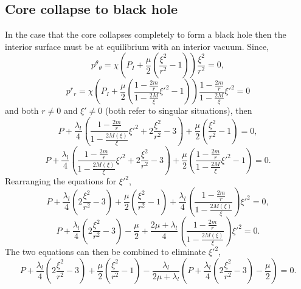 \subsection{Core collapse to black hole}
In the case that the core collapses completely to form a black hole then the interior surface must be at equilibrium with an interior vacuum. Since,
\begin{equation}
p^\theta{}_\theta = \chi\left(P_I + \frac{\mu}{2} \left(\frac{\xi^2}{r^2} - 1\right) \right) \frac{\xi^2}{r^2} = 0,
\label{eq:tangentialPressureVanishes}
\end{equation}
\begin{equation}
p^r{}_r = \chi\left(P_I + \frac{\mu}{2}\left(\frac{1-\frac{2m}{r}}{1-\frac{2M}{\xi}}\xi'^2 - 1\right)\right)\frac{1-\frac{2m}{r}}{1-\frac{2M}{\xi}}\xi'^2 = 0
\label{eq:radialPressureVanishes}
\end{equation}
and both $r\ne 0$ and $\xi' \ne 0$ (both refer to singular situations), then
\begin{equation}
P + \frac{\lambda_l}{4}\left( \frac{1 - \frac{2m}{r}}{1 - \frac{2M(\xi)}{\xi}}\xi'^2 + 2\frac{\xi^2}{r^2} - 3 \right)+ \frac{\mu}{2} \left(\frac{\xi^2}{r^2} - 1\right) = 0,
\label{eq:tangentialBHCondition}
\end{equation}
\begin{equation}
P + \frac{\lambda_l}{4}\left( \frac{1 - \frac{2m}{r}}{1 - \frac{2M(\xi)}{\xi}}\xi'^2 + 2\frac{\xi^2}{r^2} - 3 \right) + \frac{\mu}{2}\left(\frac{1-\frac{2m}{r}}{1-\frac{2M}{\xi}}\xi'^2 - 1\right) = 0.
\label{eq:radialBHCondition}
\end{equation}
Rearranging the equations for $\xi'^2$,
\begin{equation}
P + \frac{\lambda_l}{4}\left(2\frac{\xi^2}{r^2} - 3 \right) + \frac{\mu}{2} \left(\frac{\xi^2}{r^2} - 1\right) + \frac{\lambda_l}{4} \left( \frac{1 - \frac{2m}{r}}{1 - \frac{2M(\xi)}{\xi}}\right)\xi'^2 = 0,
\label{eq:tangentialBHCondition2}
\end{equation}
\begin{equation}
P + \frac{\lambda_l}{4}\left(2\frac{\xi^2}{r^2} - 3 \right) - \frac{\mu}{2} + \frac{2\mu + \lambda_l}{4} \left( \frac{1 - \frac{2m}{r}}{1 - \frac{2M(\xi)}{\xi}}\right)\xi'^2 = 0.
\label{eq:radialBHCondition2}
\end{equation}
The two equations can then be combined to eliminate $\xi'^2$,
\begin{equation}
P + \frac{\lambda_l}{4}\left(2\frac{\xi^2}{r^2} - 3 \right) + \frac{\mu}{2} \left(\frac{\xi^2}{r^2} - 1\right) - \frac{\lambda_l}{2\mu + \lambda_l}\left( P + \frac{\lambda_l}{4}\left(2\frac{\xi^2}{r^2} - 3 \right) - \frac{\mu}{2} \right) = 0.
\label{eq:quadraticBHRadius}
\end{equation}
